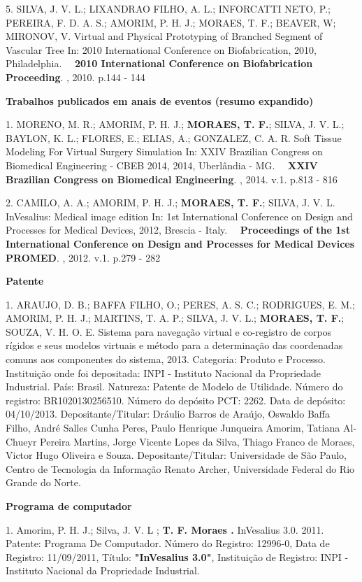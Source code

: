 5. SILVA, J. V. L.; LIXANDRAO FILHO, A. L.; INFORCATTI NETO, P.;
PEREIRA, F. D. A. S.; AMORIM, P. H. J.; MORAES, T. F.; BEAVER, W;
MIRONOV, V.
Virtual and Physical Prototyping of Branched Segment of Vascular Tree
In: 2010 International Conference on Biofabrication, 2010, Philadelphia.
    \textbf{2010 International Conference on Biofabrication Proceeding}.
, 2010. p.144 - 144

\textbf{Trabalhos publicados em anais de eventos (resumo expandido)}

1. MORENO, M. R.; AMORIM, P. H. J.; \textbf{MORAES, T. F.}; SILVA, J. V.
L.; BAYLON, K. L.; FLORES, E.; ELIAS, A.; GONZALEZ, C. A. R.
Soft Tissue Modeling For Virtual Surgery Simulation In: XXIV Brazilian
Congress on Biomedical Engineering - CBEB 2014, 2014, Uberlândia - MG.
    \textbf{XXIV Brazilian Congress on Biomedical Engineering}. , 2014.
v.1. p.813 - 816

2. CAMILO, A. A.; AMORIM, P. H. J.; \textbf{MORAES, T. F.}; SILVA, J. V.
L.
InVesalius: Medical image edition In: 1st International Conference on
Design and Processes for Medical Devices, 2012, Brescia - Italy.
    \textbf{Proceedings of the 1st International Conference on Design
and Processes for Medical Devices PROMED}. , 2012. v.1. p.279 - 282


\textbf{Patente}

1. ARAUJO, D. B.; BAFFA FILHO, O.; PERES,
A. S. C.; RODRIGUES, E. M.; AMORIM, P. H. J.; MARTINS, T. A. P.; SILVA,
J. V. L.; \textbf{MORAES, T. F.}; SOUZA, V. H. O. E.
Sistema para navegação virtual e co-registro de corpos rígidos e seus
modelos virtuais e método para a determinação das coordenadas comuns aos
componentes do sistema, 2013. Categoria: Produto e Processo. Instituição
onde foi depositada: INPI - Instituto Nacional da Propriedade
Industrial. País: Brasil. Natureza: Patente de Modelo de Utilidade.
Número do registro: BR1020130256510. Número do depósito PCT: 2262. Data
de depósito: 04/10/2013. Depositante/Titular: Dráulio Barros de Araújo,
Oswaldo Baffa Filho, André Salles Cunha Peres, Paulo Henrique Junqueira
Amorim, Tatiana Al-Chueyr Pereira Martins, Jorge Vicente Lopes da Silva,
Thiago Franco de Moraes, Victor Hugo Oliveira e Souza.
Depositante/Titular: Universidade de São Paulo, Centro de Tecnologia da
Informação Renato Archer, Universidade Federal do Rio Grande do Norte.

\textbf{Programa de computador}

1. Amorim, P. H. J.; Silva, J. V. L ; \textbf{T. F. Moraes .} InVesalius 3.0. 2011.
Patente: Programa De Computador. Número do Registro: 12996-0, Data de Registro: 11/09/2011, Título: \textbf{"InVesalius 3.0"},
Instituição de Registro: INPI - Instituto Nacional da Propriedade Industrial.
